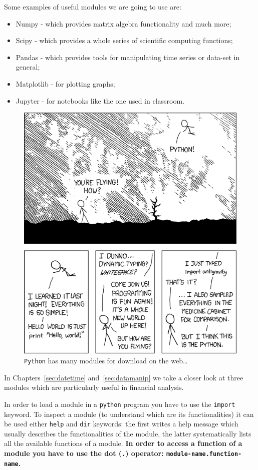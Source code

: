 Some examples of useful modules we are going to use are:

\begin{itemize}
\tightlist
\item
  Numpy - which provides matrix algebra functionality and much more;
\item
  Scipy - which provides a whole series of scientific computing
  functions;
\item
  Pandas - which provides tools for manipulating time series or data-set
  in general;
\item
  Matplotlib - for plotting graphs;
\item
  Jupyter - for notebooks like the one used in classroom.
\end{itemize}

\begin{figure}
\centering
\includegraphics[width=0.5\linewidth]{figures/python.png}
\caption{\texttt{Python} has many modules for download on the web\ldots}
\label{fig:fancy_module}
\end{figure}

In Chapters~\ref{sec:datetime} and~\ref{sec:datamanip} we take a closer look at three modules which are particularly 
useful in financial analysis.

In order to load a module in a \texttt{python} program you have to use the \texttt{import} keyword. 
To inspect a module (to understand which are its functionalities) it can be used either 
\texttt{help} and \texttt{dir} keywords: the first writes a help message which usually describes 
the functionalities of the module, the latter systematically lists all the available functions of a module.
\textbf{In order to access a function of a module you have to use the dot (\texttt{.}) operator: 
\texttt{module-name.function-name}.}

